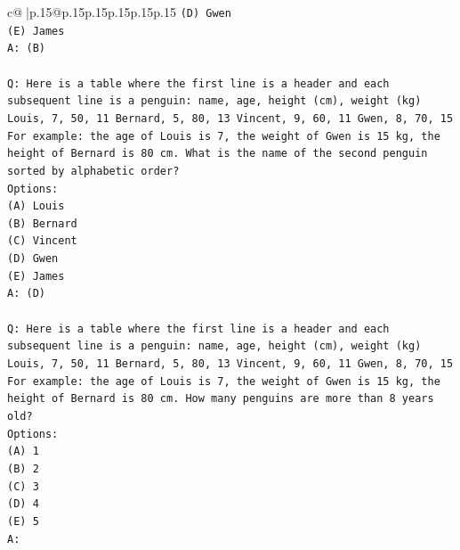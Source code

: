 \documentclass{article}
\begin{document}
{\begin{supertabular}{c@{$\;$}|p{.15\linewidth}@{}p{.15\linewidth}p{.15\linewidth}p{.15\linewidth}p{.15\linewidth}p{.15\linewidth}}
{{{\texttt{(D) Gwen} \\
\texttt{(E) James} \\
\texttt{A: (B)} \\
\\ 
\texttt{Q: Here is a table where the first line is a header and each subsequent line is a penguin:  name, age, height (cm), weight (kg) Louis, 7, 50, 11 Bernard, 5, 80, 13 Vincent, 9, 60, 11 Gwen, 8, 70, 15  For example: the age of Louis is 7, the weight of Gwen is 15 kg, the height of Bernard is 80 cm.  What is the name of the second penguin sorted by alphabetic order?} \\
\texttt{Options:} \\
\texttt{(A) Louis} \\
\texttt{(B) Bernard} \\
\texttt{(C) Vincent} \\
\texttt{(D) Gwen} \\
\texttt{(E) James} \\
\texttt{A: (D)} \\
\\ 
\texttt{Q: Here is a table where the first line is a header and each subsequent line is a penguin:  name, age, height (cm), weight (kg) Louis, 7, 50, 11 Bernard, 5, 80, 13 Vincent, 9, 60, 11 Gwen, 8, 70, 15  For example: the age of Louis is 7, the weight of Gwen is 15 kg, the height of Bernard is 80 cm.  How many penguins are more than 8 years old?} \\
\texttt{Options:} \\
\texttt{(A) 1} \\
\texttt{(B) 2} \\
\texttt{(C) 3} \\
\texttt{(D) 4} \\
\texttt{(E) 5} \\
\texttt{A:} \\
            }
        }
    }
     \\ \\


\end{supertabular}}
\end{document}
